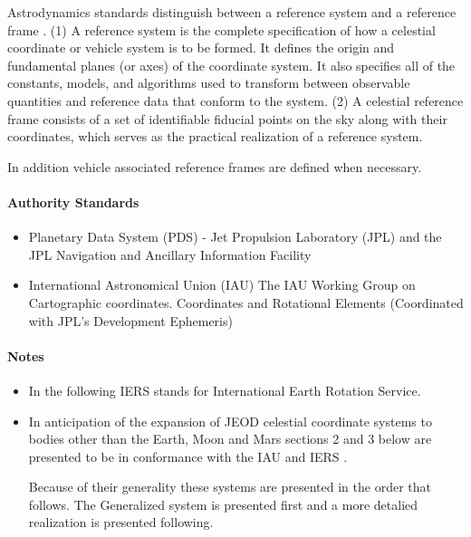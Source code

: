 \documentclass[twoside,11pt,titlepage]{report}
\begin{document}
Astrodynamics standards distinguish between a reference system and a reference frame \cite{IAU2006}.
(1) A reference system is the complete specification of how a celestial coordinate
or vehicle system is to be formed. It defines the origin and fundamental planes (or axes) of the coordinate system. It also specifies all of the constants, models, and algorithms used to transform between observable quantities and reference data that conform to the system.
(2) A celestial reference frame consists of a set of identifiable fiducial points on the sky along with their coordinates, which serves as the practical realization of a reference system.

In addition vehicle associated reference frames are defined when necessary.

\paragraph{Authority Standards}
\begin{itemize}
\item {Planetary Data System (PDS) - Jet Propulsion Laboratory (JPL) and the
JPL Navigation and Ancillary Information Facility }
\item { International Astronomical Union (IAU)
The IAU Working Group on Cartographic coordinates.
     Coordinates and Rotational Elements
(Coordinated with JPL's Development Ephemeris) }
\end{itemize}

\paragraph{Notes}
\begin{itemize}
\item {In the following IERS stands for International Earth Rotation Service.}
\item{ In anticipation of the expansion of JEOD celestial coordinate systems to bodies other than the Earth, Moon and Mars sections 2 and 3 below
are presented to be in conformance with
the IAU\cite{IAU2006} and IERS \cite{IERS2003}.

Because of their generality these systems are presented in the order that follows. The Generalized system is presented first and a more detalied realization is presented following.}
\end{itemize}



\end{document}
